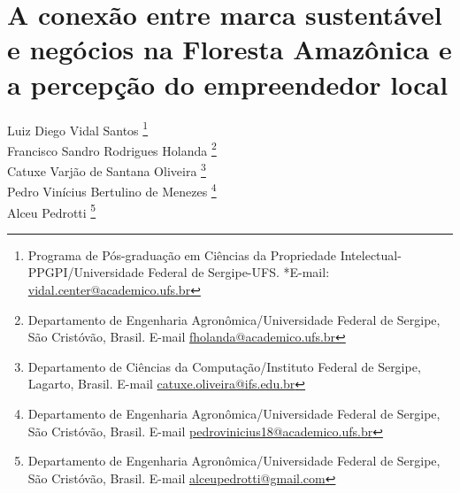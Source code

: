 \chapter{A conexão entre marca sustentável e negócios na Floresta Amazônica e a percepção do empreendedor local}

\begin{flushright}
Luiz Diego Vidal Santos  \footnote[1]{Programa de Pós-graduação em Ciências da Propriedade Intelectual-PPGPI/Universidade Federal de Sergipe-UFS. *E-mail:  \href{mailto:vidal.center@academico.ufs.br}{vidal.center@academico.ufs.br}}
\\[0.2cm] 
Francisco Sandro Rodrigues Holanda \footnote[2]{Departamento de Engenharia Agronômica/Universidade Federal de Sergipe, São Cristóvão, Brasil. E-mail \href{mailto:fholanda@academico.ufs.br}{fholanda@academico.ufs.br}}
\\[0.2cm] 
Catuxe Varjão de Santana Oliveira \footnote[3]{Departamento de Ciências da Computação/Instituto Federal de Sergipe, Lagarto, Brasil. E-mail \href{mailto:catuxe.oliveira@ifs.edu.br}{catuxe.oliveira@ifs.edu.br}}
\\[0.2cm] 
Pedro Vinícius Bertulino de Menezes \footnote[2]{Departamento de Engenharia Agronômica/Universidade Federal de Sergipe, São Cristóvão, Brasil. E-mail \href{mailto:pedrovinicius18@academico.ufs.br}{pedrovinicius18@academico.ufs.br}}
\\[0.2cm] 
Alceu Pedrotti \footnote[2]{Departamento de Engenharia Agronômica/Universidade Federal de Sergipe, São Cristóvão, Brasil. E-mail \href{mailto:alceupedrotti@gmail.com}{alceupedrotti@gmail.com}}
\end{flushright}


